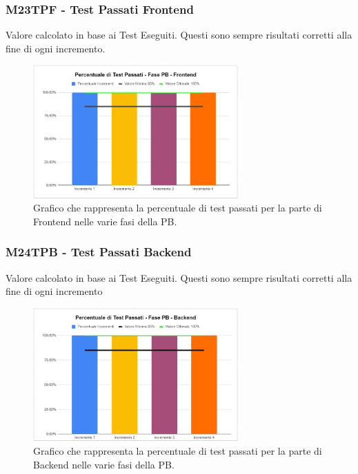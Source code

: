 \subsubsection{M23TPF - Test Passati Frontend}
Valore calcolato in base ai Test Eseguiti. Questi sono sempre risultati corretti alla fine di ogni incremento.
\begin{figure}[H]
  \centering\includegraphics[width=0.7\textwidth, height=0.7\textheight,keepaspectratio]{images/PB-Test-Passati-Frontend.png}
  \caption{Grafico che rappresenta la percentuale di test passati per la parte di Frontend nelle varie fasi della PB.}
\end{figure}    

\subsubsection{M24TPB - Test Passati Backend}
Valore calcolato in base ai Test Eseguiti. Questi sono sempre risultati corretti alla fine di ogni incremento
\vspace{1em}
\begin{figure}[H]
  \centering\includegraphics[width=0.7\textwidth, height=0.7\textheight,keepaspectratio]{images/PB-Test-Passati-Backend.png}
  \caption{Grafico che rappresenta la percentuale di test passati per la parte di Backend nelle varie fasi della PB.}
\end{figure}    



